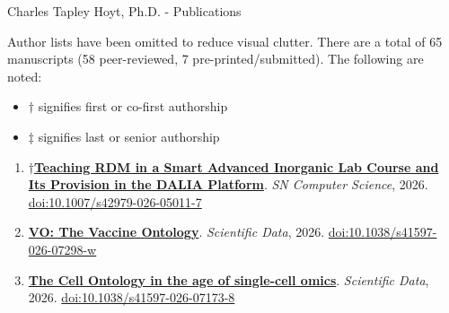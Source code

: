 \documentclass[10pt,a4paper,sans]{moderncv} %
\author{Charles Tapley Hoyt}
\newcommand{\wikidata}[2]{\href{https://bioregistry.io/wikidata:#1?provider=scholia}{{#2}}}
\begin{document}
{\Huge Charles Tapley Hoyt, Ph.D. - Publications}

\vspace{3mm}

Author lists have been omitted to reduce visual clutter.
There are a total of
65 manuscripts (58 peer-reviewed, 7 pre-printed/submitted).
The following are noted:

\begin{itemize}
\item $\dagger$ signifies first or co-first authorship
\item $\ddagger$ signifies last or senior authorship
\end{itemize}

\vspace{0.3cm}

    \begin{enumerate}
    \setcounter{enumi}{0}
    \itemsep0.5em
        \item
        $\dagger$\wikidata{Q139986539}{\textbf{Teaching RDM in a Smart Advanced Inorganic Lab Course and Its Provision in the DALIA Platform}}.
    \textit{SN Computer Science}, 2026.  {\scriptsize \href{https://bioregistry.io/doi:10.1007/S42979-026-05011-7}{doi:10.1007/s42979-026-05011-7}}
        \item
        \wikidata{Q139986544}{\textbf{VO: The Vaccine Ontology}}.
    \textit{Scientific Data}, 2026.  {\scriptsize \href{https://bioregistry.io/doi:10.1038/S41597-026-07298-W}{doi:10.1038/s41597-026-07298-w}}
        \item
        \wikidata{Q139986876}{\textbf{The Cell Ontology in the age of single-cell omics}}.
    \textit{Scientific Data}, 2026.  {\scriptsize \href{https://bioregistry.io/doi:10.1038/S41597-026-07173-8}{doi:10.1038/s41597-026-07173-8}}
    \end{enumerate}
\end{document}
